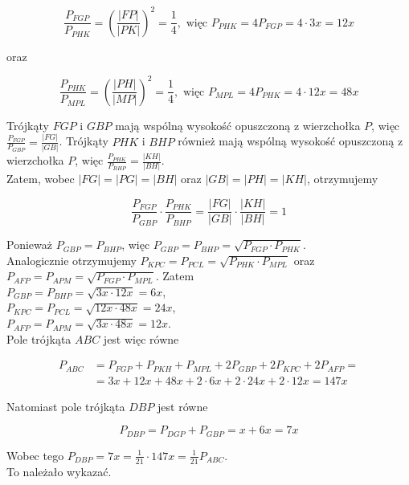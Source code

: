 \documentclass[10pt]{article}
\begin{document}
$$
\frac{P_{F G P}}{P_{P H K}}=\left(\frac{|F P|}{|P K|}\right)^{2}=\frac{1}{4}, \text { więc } P_{P H K}=4 P_{F G P}=4 \cdot 3 x=12 x
$$

oraz

$$
\frac{P_{P H K}}{P_{M P L}}=\left(\frac{|P H|}{|M P|}\right)^{2}=\frac{1}{4}, \text { więc } P_{M P L}=4 P_{P H K}=4 \cdot 12 x=48 x
$$

Trójkąty $F G P$ i $G B P$ mają wspólną wysokość opuszczoną z wierzchołka $P$, więc $\frac{P_{F G P}}{P_{G B P}}=\frac{|F G|}{|G B|}$. Trójkąty $P H K$ i $B H P$ również mają wspólną wysokość opuszczoną z wierzchołka $P$, więc $\frac{P_{P H K}}{P_{B H P}}=\frac{|K H|}{|B H|}$.\\
Zatem, wobec $|F G|=|P G|=|B H|$ oraz $|G B|=|P H|=|K H|$, otrzymujemy

$$
\frac{P_{F G P}}{P_{G B P}} \cdot \frac{P_{P H K}}{P_{B H P}}=\frac{|F G|}{|G B|} \cdot \frac{|K H|}{|B H|}=1
$$

Ponieważ $P_{G B P}=P_{B H P}$, więc $P_{G B P}=P_{B H P}=\sqrt{P_{F G P} \cdot P_{P H K}}$.\\
Analogicznie otrzymujemy $P_{K P C}=P_{P C L}=\sqrt{P_{P H K} \cdot P_{M P L}}$ oraz $P_{A F P}=P_{A P M}=\sqrt{P_{F G P} \cdot P_{M P L}}$. Zatem\\
$P_{G B P}=P_{B H P}=\sqrt{3 x \cdot 12 x}=6 x$,\\
$P_{K P C}=P_{P C L}=\sqrt{12 x \cdot 48 x}=24 x$,\\
$P_{A F P}=P_{A P M}=\sqrt{3 x \cdot 48 x}=12 x$.\\
Pole trójkąta $A B C$ jest więc równe

$$
\begin{aligned}
P_{A B C} & =P_{F G P}+P_{P K H}+P_{M P L}+2 P_{G B P}+2 P_{K P C}+2 P_{A F P}= \\
& =3 x+12 x+48 x+2 \cdot 6 x+2 \cdot 24 x+2 \cdot 12 x=147 x
\end{aligned}
$$

Natomiast pole trójkąta $D B P$ jest równe

$$
P_{D B P}=P_{D G P}+P_{G B P}=x+6 x=7 x
$$

Wobec tego $P_{D B P}=7 x=\frac{1}{21} \cdot 147 x=\frac{1}{21} P_{A B C}$.\\
To należało wykazać.
\end{document}
